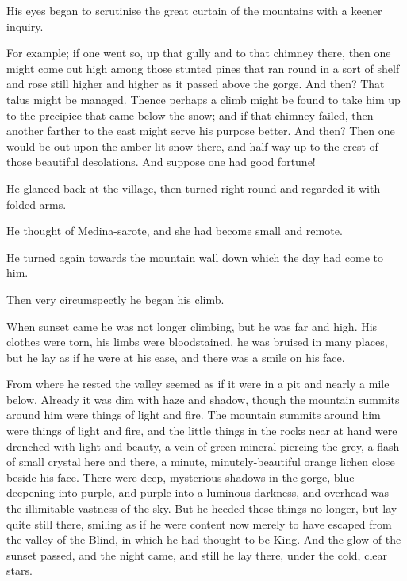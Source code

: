 \documentclass[courier]{sffms}
\begin{document}
His eyes began to scrutinise the great curtain of the mountains with a
keener inquiry.

For example; if one went so, up that gully and to that chimney there,
then one might come out high among those stunted pines that ran round
in a sort of shelf and rose still higher and higher as it passed above
the gorge. And then? That talus might be managed. Thence perhaps a
climb might be found to take him up to the precipice that came below
the snow; and if that chimney failed, then another farther to the east
might serve his purpose better. And then? Then one would be out upon
the amber-lit snow there, and half-way up to the crest of those
beautiful desolations. And suppose one had good fortune!

He glanced back at the village, then turned right round and regarded
it with folded arms.

He thought of Medina-sarote, and she had become small and remote.

He turned again towards the mountain wall down which the day had come
to him.

Then very circumspectly he began his climb.

When sunset came he was not longer climbing, but he was far and
high. His clothes were torn, his limbs were bloodstained, he was
bruised in many places, but he lay as if he were at his ease, and
there was a smile on his face.

From where he rested the valley seemed as if it were in a pit and
nearly a mile below. Already it was dim with haze and shadow, though
the mountain summits around him were things of light and fire. The
mountain summits around him were things of light and fire, and the
little things in the rocks near at hand were drenched with light and
beauty, a vein of green mineral piercing the grey, a flash of small
crystal here and there, a minute, minutely-beautiful orange lichen
close beside his face. There were deep, mysterious shadows in the
gorge, blue deepening into purple, and purple into a luminous
darkness, and overhead was the illimitable vastness of the sky. But he
heeded these things no longer, but lay quite still there, smiling as
if he were content now merely to have escaped from the valley of the
Blind, in which he had thought to be King. And the glow of the sunset
passed, and the night came, and still he lay there, under the cold,
clear stars.
\end{document}
